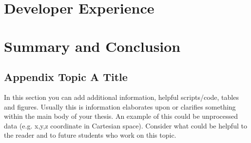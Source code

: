 \documentclass[a4paper]{book}
\begin{document}
\chapter{Developer Experience}

\chapter{Summary and Conclusion}
\cite{Gee20}
\cite{Rap20}
\cite{Piral}
\cite{Zalando}
\cite{Webpack}
\cite{Lew14}
\cite{Ben19}
\cite{Zha18}
\cite{Mez21}

\clearpage
{}


%


% 

% 


\clearpage
{}

\begin{appendix}
\chapter{Appendix Topic A Title}
In this section you can add additional information, helpful scripts/code, tables and figures. Usually this is information elaborates upon or clarifies something within the main body of your thesis. An example of this could be unprocessed data (e.g. x,y,z coordinate in Cartesian space). Consider what could be helpful to the reader and to future students who work on this topic.


\end{appendix}

\end{document}

